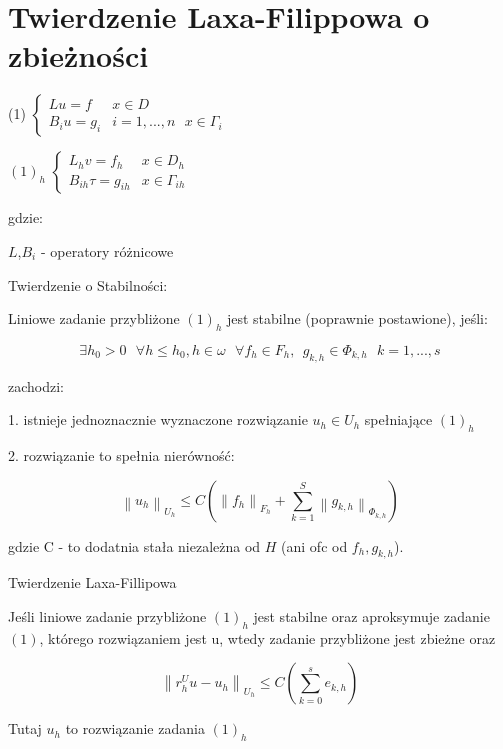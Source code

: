 \section{Twierdzenie Laxa-Filippowa o zbieżności}

(1) $\left\{\begin{matrix} Lu = f & x \in D \\ B_iu = g_i & i = 1,...,n\ \ \ x \in \Gamma _i \end{matrix}\right.$

$(1)_h$ $\left\{\begin{matrix} L_hv = f_h & x \in D_h \\ B_{ih} \tau = g_{ih} & x \in \Gamma _{ih} \end{matrix}\right.$

gdzie:

$L$,$B_i$ - operatory różnicowe

Twierdzenie o Stabilności:

Liniowe zadanie przybliżone $(1)_h$ jest stabilne (poprawnie postawione), jeśli:

\[ \exists h_0 > 0 \ \ \ \forall h \leqslant h_0 , h \in \omega \ \ \ \forall f_h \in F_h,\ \  g_{k,h} \in \Phi _{k,h}\ \ \ k = 1,...,s\]

zachodzi:

1. istnieje jednoznacznie wyznaczone rozwiązanie $u_h \in U_h$ spełniające $(1)_h$

2. rozwiązanie to spełnia nierówność:

\[ \left \| u_h \right  \|_{U_h} \leqslant C(\left \| f_h \right \|_{F_h} + \sum_{k=1}^S \left \| g_{k,h} \right \|_{\Phi _{k,h}}) \]

gdzie C - to dodatnia stała niezależna od $H$ (ani ofc od $f_h, g_{k,h}$).

Twierdzenie Laxa-Fillipowa

Jeśli liniowe zadanie przybliżone $(1)_h$ jest stabilne oraz aproksymuje zadanie $(1)$, którego rozwiązaniem jest u, wtedy zadanie przybliżone jest zbieżne oraz

\[ \left \| r_h^U u - u_h \right \|_{U_h} \leqslant C(\sum_{k=0}^{s} e_{k,h}) \]

Tutaj $u_h$ to rozwiązanie zadania $(1)_h$